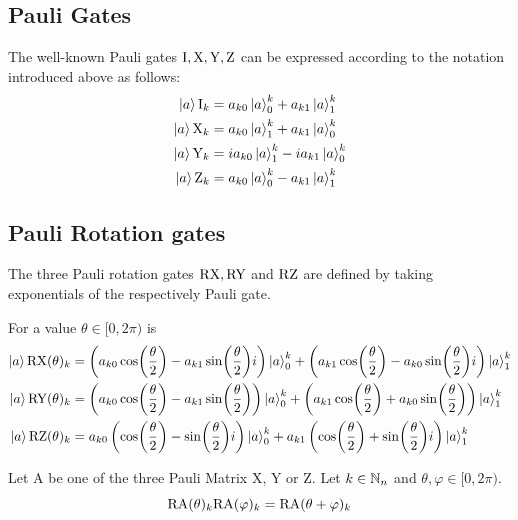 \subsection{Pauli Gates}
	The well-known Pauli gates $\text{I}, \text{X}, \text{Y}, \text{Z}$ can be expressed according to the  notation  introduced above as follows:
	\begin{align}
		\ket{a}\text{I}_k &= a_{k0}\ket{a}^{k}_{0}+a_{k1}\ket{a}^{k}_{1} \\
		\ket{a}\text{X}_k &= a_{k0}\ket{a}^{k}_{1}+a_{k1}\ket{a}^{k}_{0}\\
		\ket{a}\text{Y}_k &= ia_{k0}\ket{a}^{k}_{1}-i a_{k1}\ket{a}^{k}_{0}\\
		\ket{a}\text{Z}_k &= a_{k0}\ket{a}^{k}_{0}-a_{k1}\ket{a}^{k}_{1}
	\end{align}

\subsection{Pauli Rotation gates}
The three Pauli rotation gates $\text{RX}, \text{RY}$ and $\text{RZ}$ are defined by taking exponentials of the respectively Pauli gate.

For a value $\theta\in[0, 2\pi)$ is
\begin{align}
    \ket{a}\text{RX}(\theta)_k &= \left(a_{k0}\cos(\frac{\theta}{2})-a_{k1}\sin(\frac{\theta}{2})i\right)\ket{a}^{k}_{0}+\left(a_{k1}\cos(\frac{\theta}{2})-a_{k0}\sin(\frac{\theta}{2})i\right)\ket{a}^{k}_{1}\\
    \ket{a}\text{RY}(\theta)_k &= \left(a_{k0}\cos(\frac{\theta}{2})-a_{k1}\sin(\frac{\theta}{2})\right)\ket{a}^{k}_{0}+\left(a_{k1}\cos(\frac{\theta}{2})+a_{k0}\sin(\frac{\theta}{2})\right)\ket{a}^{k}_{1}\\
    \ket{a}\text{RZ}(\theta)_k &= a_{k0}\left(\cos(\frac{\theta}{2})-\sin(\frac{\theta}{2})i\right)\ket{a}^{k}_{0}+a_{k1}\left(\cos(\frac{\theta}{2})+\sin(\frac{\theta}{2})i\right)\ket{a}^{k}_{1}
\end{align}

\begin{proposition}
	Let A be one of the three Pauli Matrix X, Y or Z. Let $k\in\mathbb{N}_n$ and $\theta, \varphi\in[0, 2\pi)$.
	\begin{equation}
		\text{RA}(\theta)_k\text{RA}(\varphi)_k=\text{RA}(\theta+\varphi)_k
	\end{equation}
\end{proposition}
